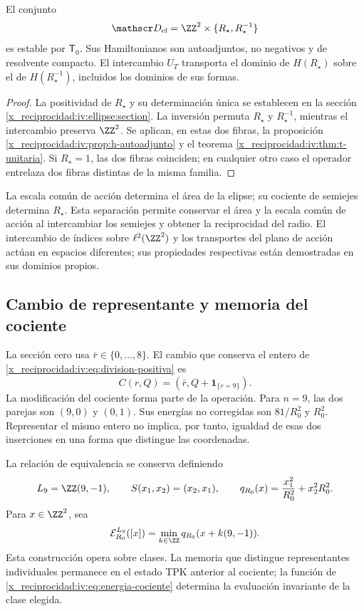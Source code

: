 \begin{corollary}
\label{x_reciprocidad:iv:cor:radio-especializado}
El conjunto
\[
 \mathscr D_{\mathrm{el}}
 =\ZZ^2\times\{R_\star,R_\star^{-1}\}
\]
es estable por \(\mathsf T_0\). Sus Hamiltonianos son autoadjuntos,
no negativos y de resolvente compacto. El intercambio \(U_T\)
transporta el dominio de \(H(R_\star)\) sobre el de
\(H(R_\star^{-1})\), incluidos los dominios de sus formas.
\end{corollary}
\begin{proof}
La positividad de \(R_\star\) y su determinación única se establecen
en la sección \ref{x_reciprocidad:iv:ellipse:section}. La inversión permuta
\(R_\star\) y \(R_\star^{-1}\), mientras el intercambio preserva
\(\ZZ^2\). Se aplican, en estas dos fibras, la proposición
\ref{x_reciprocidad:iv:prop:h-autoadjunto} y el teorema \ref{x_reciprocidad:iv:thm:t-unitaria}.
Si \(R_\star=1\), las dos fibras coinciden; en cualquier otro caso
el operador entrelaza dos fibras distintas de la misma familia.
\end{proof}

La escala común de acción determina el área de la elipse; su cociente
de semiejes determina \(R_\star\). Esta separación permite conservar
el área y la escala común de acción al intercambiar los semiejes y obtener la reciprocidad
del radio. El intercambio de índices sobre \(\ell^2(\ZZ^2)\)
y los transportes del plano de acción actúan en espacios diferentes;
sus propiedades respectivas están demostradas en sus dominios propios.

\subsection{Cambio de representante y memoria del cociente}

La sección cero usa \(\bar r\in\{0,\ldots,8\}\). El cambio
que conserva el entero de \eqref{x_reciprocidad:iv:eq:division-positiva} es
\begin{equation}
 C(r,Q)=(\bar r,Q+\mathbf1_{\{r=9\}}).
 \label{x_reciprocidad:iv:eq:cambio-seccion}
\end{equation}
La modificación del cociente forma parte de la operación.
Para \(n=9\), las dos parejas son \((9,0)\) y \((0,1)\).
Sus energías no corregidas son \(81/R_0^2\) y \(R_0^2\).
Representar el mismo entero no implica, por tanto, igualdad de
esas dos inserciones en una forma que distingue las coordenadas.

La relación de equivalencia se conserva definiendo
\[
 L_9=\ZZ(9,-1),\qquad S(x_1,x_2)=(x_2,x_1),
 \qquad q_{R_0}(x)=\frac{x_1^2}{R_0^2}+x_2^2R_0^2.
\]
Para \(x\in\ZZ^2\), sea
\begin{equation}
 \mathcal E_{R_0}^{L_9}([x])
 =\min_{k\in\ZZ}q_{R_0}(x+k(9,-1)).
 \label{x_reciprocidad:iv:eq:energia-cociente}
\end{equation}
Esta construcción opera sobre clases. La memoria que distingue
representantes individuales permanece en el estado TPK anterior
al cociente; la función de \eqref{x_reciprocidad:iv:eq:energia-cociente}
determina la evaluación invariante de la clase elegida.

